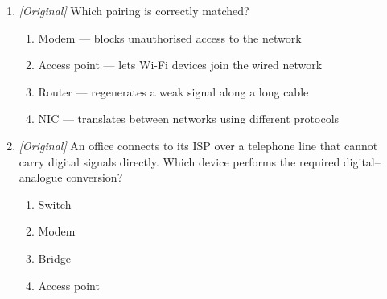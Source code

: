 \begin{enumerate}[label=\textbf{Q\arabic*.}, leftmargin=*]
\begin{enumerate}[label=\Alph*.]
  \end{enumerate}
\item \textit{[Original]} Which pairing is correctly matched?
  \begin{enumerate}[label=\Alph*.]
    \item Modem --- blocks unauthorised access to the network
    \item Access point --- lets Wi-Fi devices join the wired network
    \item Router --- regenerates a weak signal along a long cable
    \item NIC --- translates between networks using different protocols
  \end{enumerate}
\item \textit{[Original]} An office connects to its ISP over a telephone line
  that cannot carry digital signals directly. Which device performs the
  required digital--analogue conversion?
  \begin{enumerate}[label=\Alph*.]
    \item Switch
    \item Modem
    \item Bridge
    \item Access point
  \end{enumerate}


\end{enumerate}
